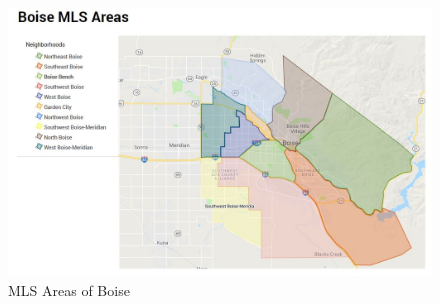 \documentclass{article}
\begin{document}
\begin{figure}[H]
    \centering
    \includegraphics[width= .8\linewidth]{images/MLS_Areas.JPG}
    \caption{MLS Areas of Boise}
    \label{fig: mls_map}
\end{figure}
\end{document}
